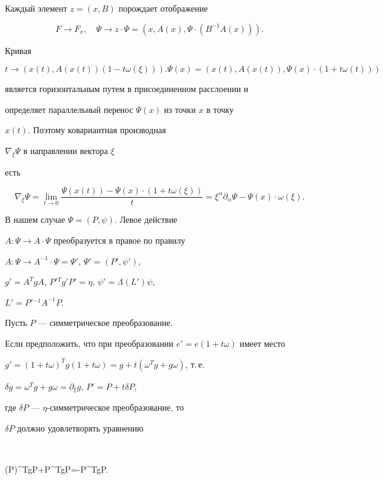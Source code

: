 Каждый элемент $z=(x,B)$ порождает отображение


$$


F\rightarrow F_x,\quad \Psi\rightarrow z\cdot\Psi=


(x,A(x),\Psi\cdot(B^{-1}A(x))).


$$


Кривая


$$


t\rightarrow (x(t),A(x(t))(1-t\omega(\xi))).\Psi (x)=


(x(t),A(x(t)),\Psi(x)\cdot(1+t\omega(t)))


$$


является горизонтальным путем в присоединенном расслоении и


определяет параллельный перенос $\Psi(x)$ из точки $x$ в точку


$x(t)$. Поэтому ковариантная производная


$\nabla_\xi\Psi$ в направлении вектора $\xi$


есть


$$


\nabla_\xi\Psi=\lim_{t\to 0}\frac{\Psi(x(t))-


\Psi(x)\cdot(1+t\omega(\xi))}{t}=\xi^\alpha\partial_\alpha\Psi


-\Psi(x)\cdot\omega(\xi).


$$


В нашем случае $\Psi=(P,\psi)$. Левое действие


$A: \Psi\rightarrow A\cdot\Psi$ преобразуется в правое по правилу


$A:\Psi\rightarrow A^{-1}\cdot\Psi=\Psi'$, $\Psi'=(P',\psi')$,


$g'=A^TgA$, $P'{}^Tg'P'=\eta$, $\psi'=\Lambda(L')\psi$,


$L'=P'{}^{-1}A^{-1}P$.


Пусть $P$ --- симметрическое преобразование.


Если предположить, что при преобразовании $e'=e(1+t\omega)$ имеет место


$g'=(1+t\omega)^Tg(1+t\omega)=g+t(\omega^Tg+g\omega)$, т.\,е.


$\delta g=\omega^Tg+g\omega=\partial_\xi g$, $P'=P+t\delta P$,


где $\delta P$ --- $\eta$-симметрическое преобразование, то


$\delta P$ должно удовлетворять уравнению


$$


(\delta P)^TgP+P^Tg\delta P=-P^T\delta gP.


